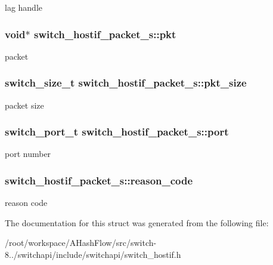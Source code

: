 lag handle \hypertarget{structswitch__hostif__packet__s_af0229aad0a9fe6783961720ce42a887a}{
\subsubsection[{pkt}]{\setlength{\rightskip}{0pt plus 5cm}void$\ast$ switch\+\_\+hostif\+\_\+packet\+\_\+s\+::pkt}}\label{structswitch__hostif__packet__s_af0229aad0a9fe6783961720ce42a887a}
packet \hypertarget{structswitch__hostif__packet__s_ab4dc6e1f2a6729cb51032ec52c4f8931}{
\subsubsection[{pkt\+\_\+size}]{\setlength{\rightskip}{0pt plus 5cm}switch\+\_\+size\+\_\+t switch\+\_\+hostif\+\_\+packet\+\_\+s\+::pkt\+\_\+size}}\label{structswitch__hostif__packet__s_ab4dc6e1f2a6729cb51032ec52c4f8931}
packet size \hypertarget{structswitch__hostif__packet__s_add347567c8574a2a9b23a30b1310b4cb}{
\subsubsection[{port}]{\setlength{\rightskip}{0pt plus 5cm}switch\+\_\+port\+\_\+t switch\+\_\+hostif\+\_\+packet\+\_\+s\+::port}}\label{structswitch__hostif__packet__s_add347567c8574a2a9b23a30b1310b4cb}
port number \hypertarget{structswitch__hostif__packet__s_aaabbb3db651c61453e5bd52e95f09942}{
\subsubsection[{reason\+\_\+code}]{ switch\+\_\+hostif\+\_\+packet\+\_\+s\+::reason\+\_\+code}}\label{structswitch__hostif__packet__s_aaabbb3db651c61453e5bd52e95f09942}
reason code 

The documentation for this struct was generated from the following file\+:\begin{DoxyCompactItemize}
\item 
/root/workspace/\+A\+Hash\+Flow/src/switch-\/8../switchapi/include/switchapi/switch\+\_\+hostif.\+h\end{DoxyCompactItemize}
